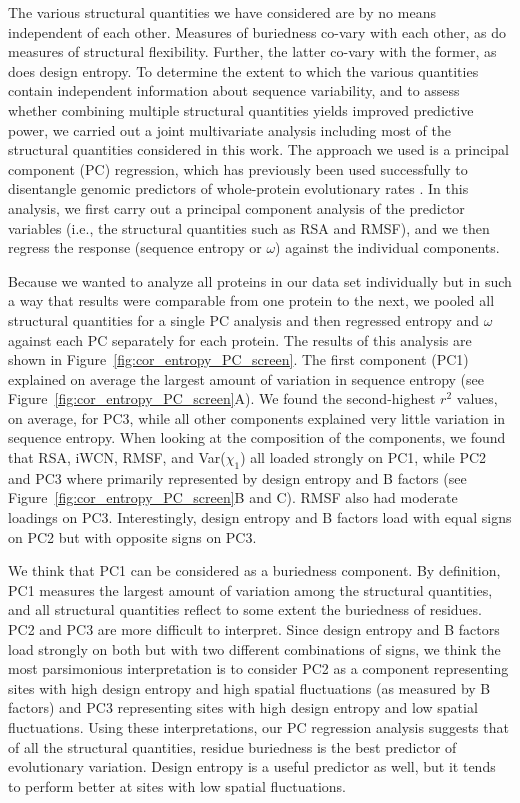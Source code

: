 \documentclass[12pt]{article}
\begin{document}
The various structural quantities we have considered are by no means independent of each other. Measures of buriedness co-vary with each other, as do measures of structural flexibility. Further, the latter co-vary with the former, as does design entropy. To determine the extent to which the various quantities contain independent information about sequence variability, and to assess whether combining multiple structural quantities yields improved predictive power, we carried out a joint multivariate analysis including most of the structural quantities considered in this work. The approach we used is a principal component (PC) regression, which has previously been used successfully to disentangle genomic predictors of whole-protein evolutionary rates \citep{Drummondetal2006,Bloometal2006}. In this analysis, we first carry out a principal component analysis of the predictor variables (i.e., the structural quantities such as RSA and RMSF), and we then regress the response (sequence entropy or $\omega$) against the individual components.

Because we wanted to analyze all proteins in our data set individually but in such a way that results were comparable from one protein to the next, we pooled all structural quantities for a single PC analysis and then regressed entropy and $\omega$ against each PC separately for each protein. The results of this analysis are shown in Figure~\ref{fig:cor_entropy_PC_screen}. The first component (PC1) explained on average the largest amount of variation in sequence entropy (see Figure~\ref{fig:cor_entropy_PC_screen}A). We found the second-highest $r^2$ values, on average, for PC3, while all other components explained very little variation in sequence entropy. When looking at the composition of the components, we found that RSA, iWCN, RMSF, and Var($\chi_1$) all loaded strongly on PC1, while PC2 and PC3 where primarily represented by design entropy and B factors (see Figure~\ref{fig:cor_entropy_PC_screen}B and C). RMSF also had moderate loadings on PC3. Interestingly, design entropy and B factors load with equal signs on PC2 but with opposite signs on PC3.

We think that PC1 can be considered as a buriedness component. By definition, PC1 measures the largest amount of variation among the structural quantities, and all structural quantities reflect to some extent the buriedness of residues. PC2 and PC3 are more difficult to interpret. Since design entropy and B factors load strongly on both but with two different combinations of signs, we think the most parsimonious interpretation is to consider PC2 as a component representing sites with high design entropy and high spatial fluctuations (as measured by B factors) and PC3 representing sites with high design entropy and low spatial fluctuations. Using these interpretations, our PC regression analysis suggests that of all the structural quantities, residue buriedness is the best predictor of evolutionary variation. Design entropy is a useful predictor as well, but it tends to perform better at sites with low spatial fluctuations.
\end{document}
